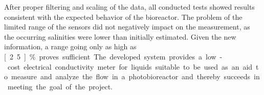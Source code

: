 After proper filtering and scaling of the data, all conducted tests showed results consistent with the expected behavior of the bioreactor. The problem of the limited range of the sensors did not negatively impact on the measurement, as the occurring salinities were lower than initially estimated. Given the new information, a range going only as high as \unit[2.5]{\%} proves sufficient. The developed system provides a low-cost electrical conductivity meter for liquids suitable to be used as an aid to measure and analyze the flow in a photobioreactor and thereby succeeds in meeting the goal of the project.